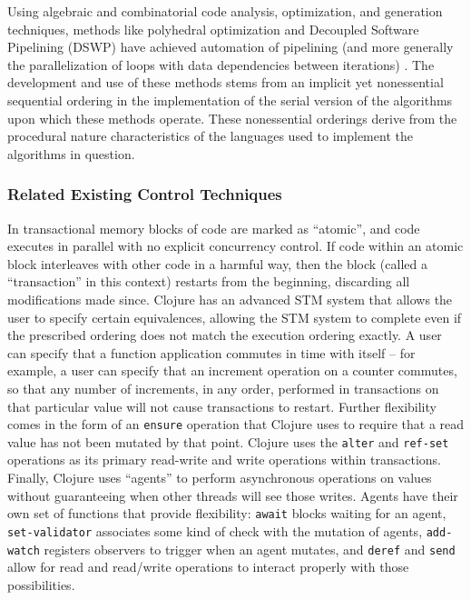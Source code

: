 \documentclass[pageno]{jpaper}
\begin{document}
Using
algebraic and combinatorial code analysis, optimization, and generation
techniques, methods like polyhedral optimization and Decoupled Software
Pipelining (DSWP) have achieved automation of pipelining (and more generally the
parallelization of loops with data dependencies between iterations)
\cite{polyopt} \cite{dswp}. The development and use of these methods stems from
an implicit yet nonessential sequential ordering in the implementation of the
serial version of the algorithms upon which these methods operate. These
nonessential orderings derive from the procedural nature characteristics of the
languages used to implement the algorithms in question.

\subsubsection{Related Existing Control Techniques}
In transactional memory blocks of code are
marked as ``atomic'', and code executes in parallel with no explicit concurrency
control. If code within an atomic block interleaves with other code in a harmful
way, then the block (called a ``transaction'' in this context) restarts from the
beginning, discarding all modifications made since. Clojure has an advanced STM
system that allows the user to specify certain equivalences, allowing the STM
system to complete even if the prescribed ordering does not match the execution
ordering exactly. A user can specify that a function application commutes in time
with itself -- for example, a user can specify that an increment operation on a
counter commutes, so that any number of increments, in any order, performed in
transactions on that particular value will not cause transactions to restart. Further
flexibility comes in the form of an \texttt{ensure} operation that Clojure uses to
require that a read value has not been mutated by that point. Clojure uses the
\texttt{alter} and \texttt{ref-set} operations as its primary read-write and write
operations within transactions. Finally, Clojure uses ``agents'' to perform
asynchronous operations on values without guaranteeing when other threads will
see those writes. Agents have their own set of functions that provide
flexibility: \texttt{await} blocks waiting for an agent, \texttt{set-validator}
associates some kind of check with the mutation of agents, \texttt{add-watch}
registers observers to trigger when an agent mutates, and \texttt{deref} and
\texttt{send} allow for read and read/write operations to interact properly with
those possibilities.
\end{document}
